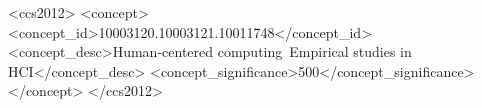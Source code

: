 \documentclass[sigconf]{acmart}
\begin{document}
\begin{CCSXML}
<ccs2012>
   <concept>
       <concept_id>10003120.10003121.10011748</concept_id>
       <concept_desc>Human-centered computing~Empirical studies in HCI</concept_desc>
       <concept_significance>500</concept_significance>
       </concept>
 </ccs2012>
\end{CCSXML}



\maketitle









\end{document}
